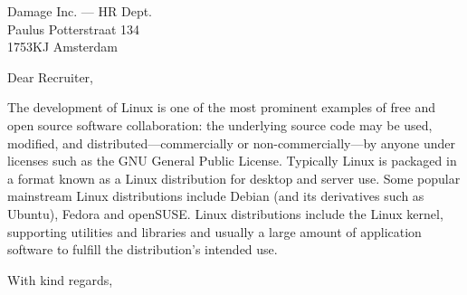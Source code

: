 \documentclass[standard]{scrlttr2}
\begin{document}
\begin{letter}{
   Damage Inc. --- HR Dept.\\
   Paulus Potterstraat 134\\
   1753KJ Amsterdam \\
}


\opening{Dear Recruiter,}

The development of Linux is one of the most prominent examples of free and open source software collaboration: the underlying source code may be used, modified, and distributed—commercially or non-commercially—by anyone under licenses such as the GNU General Public License. Typically Linux is packaged in a format known as a Linux distribution for desktop and server use. Some popular mainstream Linux distributions include Debian (and its derivatives such as Ubuntu), Fedora and openSUSE. Linux distributions include the Linux kernel, supporting utilities and libraries and usually a large amount of application software to fulfill the distribution's intended use.

\closing{With kind regards,}

\end{letter}
\end{document}
